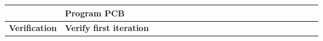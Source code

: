 \begin{table}[ht!]
\begin{tabular}{lp{2.5in}|llllllllllllllllllll|}
    \multicolumn{1}{|l|}{\cellcolor[HTML]{00E2FF}\textbf{}}                & \cellcolor[HTML]{00E2FF}\textbf{Program PCB}                               & \multicolumn{1}{l|}{}                                   & \multicolumn{1}{l|}{}                                   & \multicolumn{1}{l|}{}                                   & \multicolumn{1}{l|}{}                                   & \multicolumn{1}{l|}{}                                   & \multicolumn{1}{l|}{}                                   & \multicolumn{1}{l|}{}                                   & \multicolumn{1}{l|}{}                                   & \multicolumn{1}{l|}{\cellcolor[HTML]{F8A102}}           & \multicolumn{1}{l|}{}                                    & \multicolumn{1}{l|}{}                                    & \multicolumn{1}{l|}{\cellcolor[HTML]{F8A102}}            & \multicolumn{1}{l|}{\cellcolor[HTML]{F8A102}}            & \multicolumn{1}{l|}{}                                    & \multicolumn{1}{l|}{}                                    & \multicolumn{1}{l|}{\cellcolor[HTML]{F8A102}}            & \multicolumn{1}{l|}{}                                    & \multicolumn{1}{l|}{}                                    & \multicolumn{1}{l|}{}                                    &             \\ \hline
    \multicolumn{1}{|l|}{\cellcolor[HTML]{00E2FF}\textbf{Verification}}    & \cellcolor[HTML]{00E2FF}\textbf{Verify first iteration}                    & \multicolumn{1}{l|}{}                                   & \multicolumn{1}{l|}{}                                   & \multicolumn{1}{l|}{}                                   & \multicolumn{1}{l|}{}                                   & \multicolumn{1}{l|}{}                                   & \multicolumn{1}{l|}{}                                   & \multicolumn{1}{l|}{}                                   & \multicolumn{1}{l|}{}                                   & \multicolumn{1}{l|}{}                                   & \multicolumn{1}{l|}{\cellcolor[HTML]{F8A102}}            & \multicolumn{1}{l|}{}                                    & \multicolumn{1}{l|}{}                                    & \multicolumn{1}{l|}{}                                    & \multicolumn{1}{l|}{}                                    & \multicolumn{1}{l|}{}                                    & \multicolumn{1}{l|}{}                                    & \multicolumn{1}{l|}{}                                    & \multicolumn{1}{l|}{}                                    & \multicolumn{1}{l|}{}                                    &             \\ \hline

\end{tabular}
\end{table}
